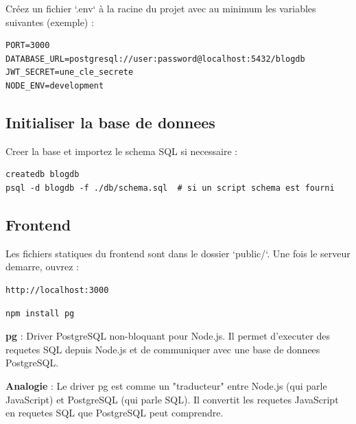 \documentclass[a4paper,12pt]{book}
\begin{document}
Créez un fichier `.env` à la racine du projet avec au minimum les variables suivantes (exemple) :

\begin{lstlisting}[style=bash, caption=Exemple de .env (variables importantes)]
PORT=3000
DATABASE_URL=postgresql://user:password@localhost:5432/blogdb
JWT_SECRET=une_cle_secrete
NODE_ENV=development
\end{lstlisting}

\subsection{Initialiser la base de donnees}

Creer la base et importez le schema SQL si necessaire :

\begin{lstlisting}[style=bash, caption=Initialisation de la base de donnees]
createdb blogdb
psql -d blogdb -f ./db/schema.sql  # si un script schema est fourni
\end{lstlisting}

\subsection{Frontend}

Les fichiers statiques du frontend sont dans le dossier `public/`. Une fois le serveur demarre, ouvrez :

\begin{lstlisting}[style=bash, caption=Acces local]
http://localhost:3000
\end{lstlisting}


\begin{lstlisting}[style=bash, caption=Installation du driver pg]
npm install pg
\end{lstlisting}

\begin{definitionbox}
    \textbf{pg} : Driver PostgreSQL non-bloquant pour Node.js. Il permet d'executer des requetes SQL depuis Node.js et de communiquer avec une base de donnees PostgreSQL.
\end{definitionbox}

\begin{analogybox}
    \textbf{Analogie} : Le driver pg est comme un "traducteur" entre Node.js (qui parle JavaScript) et PostgreSQL (qui parle SQL). Il convertit les requetes JavaScript en requetes SQL que PostgreSQL peut comprendre.
\end{analogybox}
\end{document}
